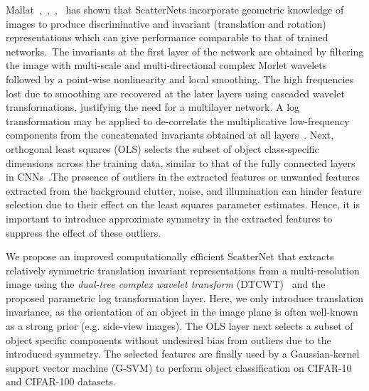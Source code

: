 \documentclass{article}
\begin{document}
Mallat~\cite{Jbruna2013},~\cite{sifre2013},~\cite{sifre2014},~\cite{Oyallon2015} has shown that ScatterNets incorporate geometric knowledge of images to produce discriminative and invariant (translation and rotation) representations which can give performance comparable to that of trained networks.~The invariants at the first layer of the network are obtained by filtering the image with multi-scale and multi-directional complex  Morlet wavelets followed by a point-wise nonlinearity and local smoothing. The high frequencies lost due to smoothing are recovered at the later layers using cascaded wavelet transformations, justifying the need for a multilayer network. A log transformation may be applied to de-correlate the multiplicative low-frequency components from the concatenated invariants obtained at all layers~\cite{Oyallon2015}. Next, orthogonal least squares (OLS) selects the subset of object class-specific dimensions across the training data, similar to that of the fully connected layers in CNNs~\cite{Oyallon2015}.The presence of outliers in the extracted features or unwanted features extracted from the background clutter, noise, and illumination can hinder feature selection due to their effect on the least squares parameter estimates. Hence, it is important to introduce approximate symmetry in the extracted features to suppress the effect of these outliers. 

We propose an improved computationally efficient ScatterNet that extracts relatively symmetric translation invariant representations from a multi-resolution image using the \textit{dual-tree complex wavelet transform} (DTCWT)~\cite{Kingsbury1998} and the proposed parametric log transformation layer. Here, we only introduce translation invariance, as the orientation of an object in the image plane is often well-known as a strong prior (e.g. side-view images). The OLS layer next selects a subset of object specific components without undesired bias from outliers due to the introduced symmetry. The selected features are finally used by a Gaussian-kernel support vector machine (G-SVM) to perform object classification on CIFAR-10 and CIFAR-100 datasets.  
\end{document}
